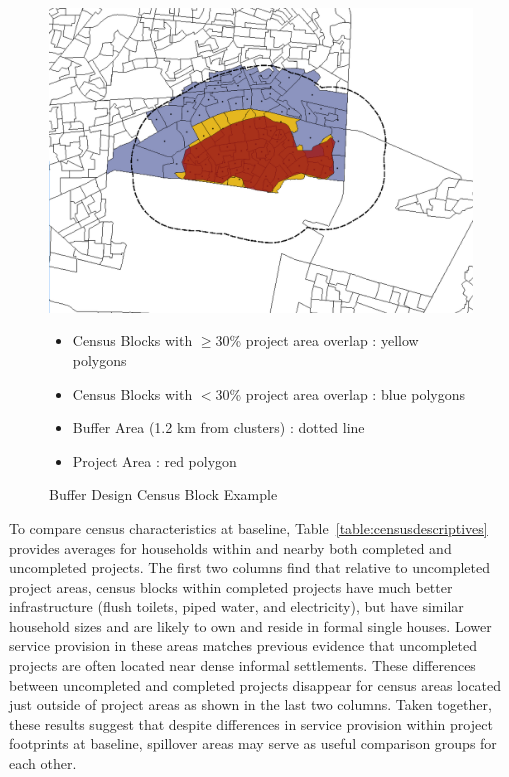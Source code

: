 \documentclass[12pt]{article}
\begin{document}
\begin{figure}
\caption{Buffer Design Census Block Example}\label{figure:bufferdesigncensus}
\centering
\includegraphics[scale=.4]{figures/design_7.png} 
\begin{itemize}
\item Census Blocks with $\geq$30\% project area overlap : yellow polygons 
\item Census Blocks with $<$30\% project area overlap : blue polygons
\item Buffer Area (1.2 km from clusters) : dotted line
\item Project Area : red polygon
\end{itemize}
\end{figure}

To compare census characteristics at baseline, Table~\ref{table:censusdescriptives} provides averages for households within and nearby both completed and uncompleted projects.  The first two columns find that relative to uncompleted project areas, census blocks within completed projects have much better infrastructure (flush toilets, piped water, and electricity), but have similar household sizes and are likely to own and reside in formal single houses.  Lower service provision in these areas matches previous evidence that uncompleted projects are often located near dense informal settlements.  These differences between uncompleted and completed projects disappear for census areas located just outside of project areas as shown in the last two columns.  Taken together, these results suggest that despite differences in service provision within project footprints at baseline, spillover areas may serve as useful comparison groups for each other.
\end{document}
